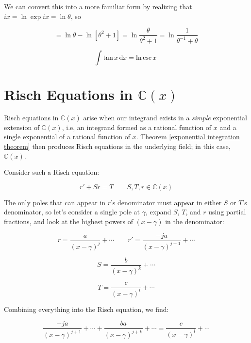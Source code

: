 We can convert this into a more familiar form by realizing 
that $ix = \ln \exp ix = \ln \theta$, so

$$  = \ln \theta - \ln \left[ \theta^2 + 1 \right]
= \ln \frac{\theta}{\theta^2 + 1}
= \ln \frac{1}{\theta^{-1} + \theta}$$

$$\int \tan x \, {\rm d}x = \ln \csc x$$

\endexample

\vfill\eject
\section{Risch Equations in ${\mathbb C}(x)$}

Risch equations in ${\mathbb C}(x)$ arise when our integrand exists in
a {\it simple} exponential extension of ${\mathbb C}(x)$,
i.e, an integrand formed as a rational function of $x$ and a
single exponential of a rational function of $x$.  Theorem
\ref{exponential integration theorem}
then produces Risch equations in the underlying field;
in this case, ${\mathbb C}(x)$.

Consider such a Risch equation:

$$r' + S r = T \qquad S,T,r \in {\mathbb C}(x)$$

\begin{comment}
Recall that in ${\mathbb C}(x)$, irreducible factors in the
denominator always increase in degree on differentiation, so $A$'s
factors are the only factors that can appears in $q$'s denominator,
because they must cancel against $q'$.  Thus, we can easily identify
which irreducible factors can appear in $q$'s denominator, and we next
wish to calculate the multiplicities with which they appear.
\end{comment}

The only poles that can appear in $r$'s denominator must appear in
either $S$ or $T$'s denominator, so let's consider a single pole at
$\gamma$, expand $S$, $T$, and $r$ using partial fractions, and look
at the highest powers of $(x-\gamma)$ in the denominator:

$$r = \frac{a}{(x-\gamma)^j} + \cdots  \qquad  r' = \frac{-ja}{(x-\gamma)^{j+1}} + \cdots$$

$$S = \frac{b}{(x-\gamma)^k} + \cdots$$

$$T = \frac{c}{(x-\gamma)^l} + \cdots$$

Combining everything into the Risch equation, we find:

$$\frac{-ja}{(x-\gamma)^{j+1}} + \cdots + \frac{ba}{(x-\gamma)^{j+k}} + \cdots = \frac{c}{(x-\gamma)^l} + \cdots$$

